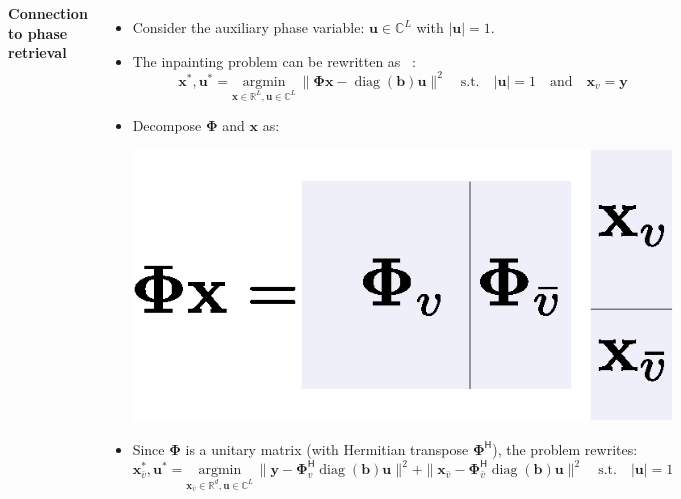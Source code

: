 \documentclass[25pt,a0paper]{tikzposter}
\newcommand{\vct}[1]{\bm{#1}} %
\newcommand{\mtx}[1]{\bm{#1}} %
\DeclareMathOperator*{\diag}{diag}
\def\C{\mathbb{C}} %
\def\R{\mathbb{R}} %
\begin{document}
\begin{columns}
{\vspace{1cm}
\textbf{Connection to phase retrieval}
\vspace{1 cm}
\begin{itemize}
    \item Consider the auxiliary phase variable: $\vct{u} \in \C^{L}$ with $|\vct{u}| = 1$.
    \item The inpainting problem can be rewritten as ~\cite{Waldspurger2015}:
\begin{equation*}
    \vct{x}^{\ast},\vct{u}^{\ast} =  \underset{\vct{x} \in \R^{L}, \vct{u} \in \C^{L}}{\text{argmin}}\,\|\mtx{\Phi} \vct{x}- \diag(\vct{b})  \vct{u}\|^{2}  \quad \text{s.t.}  \quad  |\vct{u}| =1 \quad \text{and}  \quad \vct{x}_{v}= \vct{y}
\end{equation*}
 \vspace{0.5em}
    \item Decompose $\mtx{\Phi}$ and $\vct{x}$ as: 
\begin{center}
\vspace{-3em}
    \includegraphics[scale=0.9]{phi_x_bar.eps}
\end{center}
    \item Since $\mtx{\Phi}$ is a unitary matrix (with Hermitian transpose $\mtx{\Phi}^{\mathsf{H}}$), the problem rewrites:
\begin{equation*}
   \vct{x}_{\bar{v}}^{\ast},\vct{u}^{\ast} =  \underset{\vct{x}_{\bar{v}} \in \R^{d}, \vct{u} \in \C^{L}}{\text{argmin}}\,\|\vct{y}- \mtx{\Phi}_{v}^{\mathsf{H}}\diag(\vct{b}) \vct{u}\|^{2} +  \|\vct{x}_{\bar{v}}- \mtx{\Phi}_{\bar{v}}^{\mathsf{H}}\diag(\vct{b}) \vct{u}\|^{2} \quad \text{s.t.}  \quad  |\vct{u}| = 1%
\end{equation*}
\end{itemize}

}
\end{columns}
\end{document}
